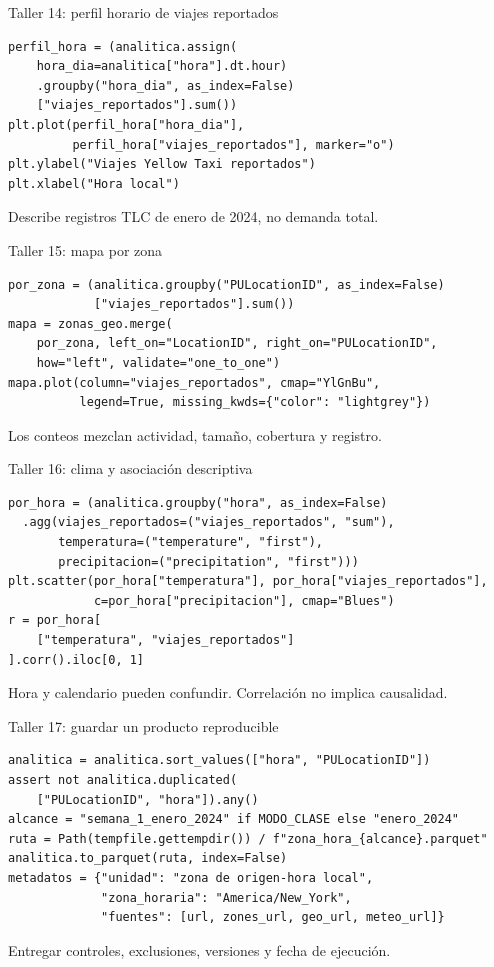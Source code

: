 \documentclass[aspectratio=169,11pt]{beamer}
\begin{document}
\begin{frame}[fragile]{Taller 14: perfil horario de viajes reportados}
\begin{verbatim}
perfil_hora = (analitica.assign(
    hora_dia=analitica["hora"].dt.hour)
    .groupby("hora_dia", as_index=False)
    ["viajes_reportados"].sum())
plt.plot(perfil_hora["hora_dia"],
         perfil_hora["viajes_reportados"], marker="o")
plt.ylabel("Viajes Yellow Taxi reportados")
plt.xlabel("Hora local")
\end{verbatim}
  \small Describe registros TLC de enero de 2024, no demanda total.
\end{frame}

\begin{frame}[fragile]{Taller 15: mapa por zona}
\begin{verbatim}
por_zona = (analitica.groupby("PULocationID", as_index=False)
            ["viajes_reportados"].sum())
mapa = zonas_geo.merge(
    por_zona, left_on="LocationID", right_on="PULocationID",
    how="left", validate="one_to_one")
mapa.plot(column="viajes_reportados", cmap="YlGnBu",
          legend=True, missing_kwds={"color": "lightgrey"})
\end{verbatim}
  \small Los conteos mezclan actividad, tamaño, cobertura y registro.
\end{frame}

\begin{frame}[fragile]{Taller 16: clima y asociación descriptiva}
\begin{verbatim}
por_hora = (analitica.groupby("hora", as_index=False)
  .agg(viajes_reportados=("viajes_reportados", "sum"),
       temperatura=("temperature", "first"),
       precipitacion=("precipitation", "first")))
plt.scatter(por_hora["temperatura"], por_hora["viajes_reportados"],
            c=por_hora["precipitacion"], cmap="Blues")
r = por_hora[
    ["temperatura", "viajes_reportados"]
].corr().iloc[0, 1]
\end{verbatim}
  \small Hora y calendario pueden confundir. \alert{Correlación no implica causalidad.}
\end{frame}

\begin{frame}[fragile]{Taller 17: guardar un producto reproducible}
\begin{verbatim}
analitica = analitica.sort_values(["hora", "PULocationID"])
assert not analitica.duplicated(
    ["PULocationID", "hora"]).any()
alcance = "semana_1_enero_2024" if MODO_CLASE else "enero_2024"
ruta = Path(tempfile.gettempdir()) / f"zona_hora_{alcance}.parquet"
analitica.to_parquet(ruta, index=False)
metadatos = {"unidad": "zona de origen-hora local",
             "zona_horaria": "America/New_York",
             "fuentes": [url, zones_url, geo_url, meteo_url]}
\end{verbatim}
  \small Entregar controles, exclusiones, versiones y fecha de ejecución.
\end{frame}
\end{document}
